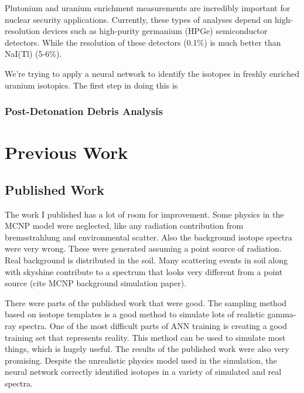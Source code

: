 \documentclass[thesis,tocnosub,noragright,centerchapter,12pt,fullpage]{uiucecethesis09}
\begin{document}
Plutonium and uranium enrichment measurements are incredibly important for nuclear security applications. Currently, these types of analyses depend on high-resolution devices such as high-purity germanium (HPGe) semiconductor detectors. While the resolution of these detectors (0.1\%) is much better than NaI(Tl) (5-6\%).

We're trying to apply a neural network to identify the isotopes in freshly enriched uranium isotopics. The first step in doing this is 



















\subsection{Post-Detonation Debris Analysis}


\chapter{Previous Work}

\section{Published Work}

The work I published has a lot of room for improvement. Some physics in the MCNP model were neglected, like any radiation contribution from bremsstrahlung and environmental scatter. Also the background isotope spectra were very wrong. These were generated assuming a point source of radiation. Real background is distributed in the soil. Many scattering events in soil along with skyshine contribute to a spectrum that looks very different from a point source (cite MCNP background simulation paper). 

There were parts of the published work that were good. The sampling method based on isotope templates is a good method to simulate lots of realistic gamma-ray spectra. One of the most difficult parts of ANN training is creating a good training set that represents reality. This method can be used to simulate most things, which is hugely useful. The results of the published work were also very promising. Despite the unrealistic physics model used in the simulation, the neural network correctly identified isotopes in a variety of simulated and real spectra. 
\end{document}
